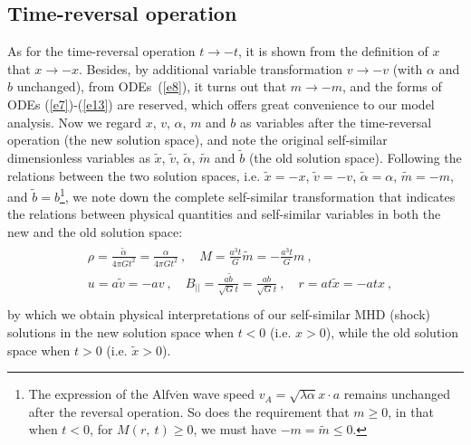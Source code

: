\documentclass[fleqn,usenatbib]{mnras}
\begin{document}
\subsection{Time-reversal operation}
\label{s2.2}
As for the time-reversal operation $t\rightarrow -t$, it is shown from the definition of $x$ that $x\rightarrow -x$. Besides, by additional variable transformation $v\rightarrow -v$ (with $\alpha$ and $b$ unchanged), from ODEs~(\ref{e8}), it turns out that $m\rightarrow -m$, and the forms of ODEs (\ref{e7})-(\ref{e13}) are reserved, which offers great convenience to our model analysis. Now we regard $x$, $v$, $\alpha$, $m$ and $b$ as variables after the time-reversal operation (the new solution space), and note the original self-similar dimensionless variables as $\widetilde{x}$, $\widetilde{v}$, $\widetilde{\alpha}$, $\widetilde{m}$ and $\widetilde{b}$ (the old solution space). 
Following the relations between the two solution spaces, i.e. $\widetilde{x}=-x$, $\widetilde{v}=-v$, $\widetilde{\alpha}=\alpha$, $\widetilde{m}=-m$, and $\widetilde{b}=b$\footnote{The expression of the $\text{Alfv}\mathrm{\acute{e}}\text{n}$ wave speed $v_{A}=\sqrt{\lambda\alpha}x\cdot a$ remains unchanged after the reversal operation. So does the requirement that $m\geq 0$, in that when $t<0$, for $M(r,\ t)\geq 0$, we must have $-m=\widetilde{m}\leq 0$.}, we note down the complete self-similar transformation that indicates the relations between physical quantities and self-similar variables in both the new and the old solution space:
\begin{gather}
\begin{split}
&\rho=\frac{\widetilde{\alpha}}{4\pi Gt^{2}}=\frac{\alpha}{4\pi Gt^{2}}\ ,\quad M=\frac{a^{3}t}{G}\widetilde{m}=-\frac{a^{3}t}{G}m\ ,\\
&u=a\widetilde{v}=-av\ ,\quad B_{||}=\frac{a\widetilde{b}}{\sqrt{G}t}=\frac{ab}{\sqrt{G}t}\ ,\quad r=at\widetilde{x}=-atx\ ,\\
\end{split}\label{ex3}
\end{gather}
by which we obtain physical interpretations of our self-similar MHD (shock) solutions in the new solution space when $t<0$ (i.e. $x>0$), while the old solution space when $t>0$ (i.e. $\widetilde{x}>0$).
\end{document}
